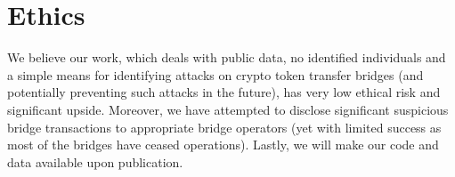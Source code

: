 \section{Ethics}
\label{sec:ethics}

We believe our work, which deals with public data, no identified
individuals and a simple means for identifying attacks on crypto token
transfer bridges (and potentially preventing such attacks in the
future), has very low ethical risk and significant upside. Moreover, we have attempted to disclose significant suspicious bridge
transactions to appropriate bridge operators (yet with limited
success as most of the bridges have ceased operations). Lastly, we will make our code and data available upon publication.
% 






